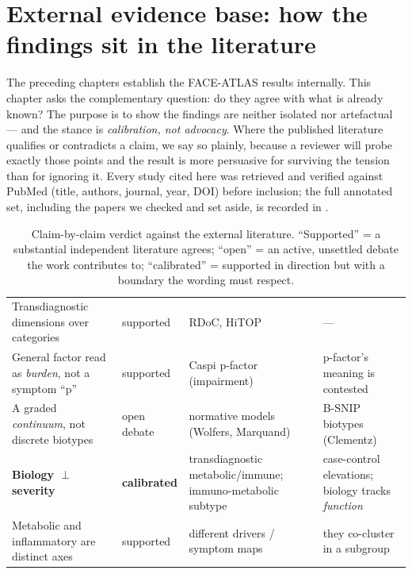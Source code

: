 \section{External evidence base: how the findings sit in the literature}
\label{sec:evidence}

The preceding chapters establish the FACE-ATLAS results internally. This chapter asks the complementary
question: do they agree with what is already known? The purpose is to show the findings are neither isolated
nor artefactual --- and the stance is \emph{calibration, not advocacy}. Where the published literature
qualifies or contradicts a claim, we say so plainly, because a reviewer will probe exactly those points and the
result is more persuasive for surviving the tension than for ignoring it. Every study cited here was retrieved
and verified against PubMed (title, authors, journal, year, DOI) before inclusion; the full annotated set,
including the papers we checked and set aside, is recorded in .

\begin{table}[h]\centering\small\sffamily
\caption{Claim-by-claim verdict against the external literature. ``Supported'' = a substantial independent
literature agrees; ``open'' = an active, unsettled debate the work contributes to; ``calibrated'' = supported
in direction but with a boundary the wording must respect.}
\label{tab:evidence}
\begin{tabular}{L{4.2cm} L{2.1cm} L{4.2cm} L{3.3cm}}
\toprule
{} &  &  & \\
\midrule
{} Transdiagnostic dimensions over categories & supported & RDoC, HiTOP & ---\\
General factor read as \emph{burden}, not a symptom ``p'' & supported & Caspi p-factor (impairment) & p-factor's meaning is contested\\
 A graded \emph{continuum}, not discrete biotypes & open debate & normative models (Wolfers, Marquand) & B-SNIP biotypes (Clementz)\\
\textbf{Biology $\perp$ severity} & \textbf{calibrated} & transdiagnostic metabolic/immune; immuno-metabolic subtype & case-control elevations; biology tracks \emph{function}\\
 Metabolic and inflammatory are distinct axes & supported & different drivers / symptom maps & they co-cluster in a subgroup\\
\bottomrule
\end{tabular}
\end{table}

